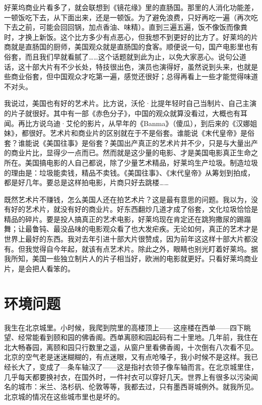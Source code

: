 好莱坞商业片看多了，就会联想到《镜花缘》里的直肠国。那里的人消化功能差，一顿饭吃下去，从下面出来，还是一顿饭。为了避免浪费，只好再吃一遍（再次吃下去之前，可能会回回锅，加点香油、味精）。直到三遍五遍，饭不像饭而像粪时，才换上新饭。这个比方多少有点恶心，但我想不到更好的比方了。好莱坞的片商就是直肠国的厨师，美国观众就是直肠国的食客。顺便说一句，国产电影里也有俗套，而且我们早就看腻了……这个话题就到此为止，以免大家恶心。说句公道话，这十部大片有不少长处，特技很出色，演员也演得好，虽然说到头来，也就是些商业俗套，但中国观众才吃第一遍，感觉还很好；总得再看上一些才能觉得味道不对头。 

我说过，美国也有好的艺术片。比方说，沃伦·比提年轻时自己当制片、自己主演的片子就很好。其中有一部《赤色分子》，中国的观众就算没看过，大概也有耳闻。再比方说乌迪·艾伦的影片，从早年的《Banma》（傻瓜），到后来的《汉娜姐妹》，都很好。艺术片和商业片的区别就在于不是俗套。谁能说《末代皇帝》是俗套？谁能说《美国往事》是俗套？美国出产真正的艺术片并不少，只是与大量出产的商业片比，显得少一点而已。然而就是这少量的电影、才是美国电影真正生命之所在。美国搞电影的人自己都说，除了少量艺术精品，好莱坞生产垃圾。制造垃圾的理由是：垃圾能卖钱，精品不卖钱。《美国往事》、《末代皇帝》从筹划到拍成，都是好几年。要总是这样拍电影，片商只好去跳楼…… 

既然艺术片不赚钱，怎么美国人还在拍艺术片？这是最有意思的问题。我以为，没有好的艺术片，就没有好的商业片。好东西翻炒几道才成了俗套，文化垃圾恰恰是精品的碎片。要是投人搞真正的艺术电影，好莱坞现在肯定还在跳狗撒尿的踢蹋舞；让最鲁钝、最没品味的电影观众看了也大发疟疾。无论如何，真正的艺术才是世界上最好的东西。我对去年引进十部大片很赞成，因为前年这这样十部大片都没有。但我觉得自今年起，就该有点艺术片。除此之外，眼睛也别光盯着好莱坞。据我所知，美国一些独立制片人的片子相当好，欧洲的电影就更好。只看好莱坞商业片，是会把人看笨的。
 
\chapter{环境问题}

我生在北京城里。小时候，我爬到院里的高楼顶上——这座楼在西单——四下眺望、经常能看到颐和园的佛香阁。西单离颐和园起码有二十里地。几年前，我住在北大畅春园，离颐和园只行数里之遥，从窗户里看佛香阁，十次倒有八次看不见。北京的空气老是迷迷糊糊的，有点迷眼，又有点呛嗓子，我小时候不是这样。我已经长大了，变成了—条车轴汉了——这是指衬衣领子像车轴而言。在北京城里住，几乎每天都要换衬衣，在国外时，一件衬衣可以穿好几天。世界上有很多以污染闻名的城市：米兰、洛杉矾、伦敦等等，我都去过，只有墨西哥城例外。就我所见。北京城的情况在这些城市里也是坏的。 

